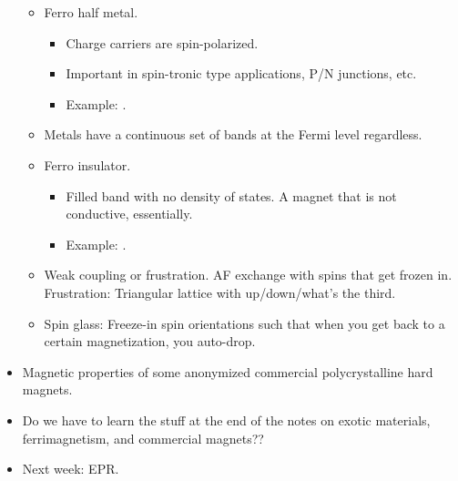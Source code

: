 \documentclass[../notes.tex]{subfiles}
\begin{document}
\begin{itemize}
\begin{itemize}
        \item Ferro half metal.
        \begin{itemize}
            \item Charge carriers are spin-polarized.
            \item Important in spin-tronic type applications, P/N junctions, etc.
            \item Example: .
        \end{itemize}
        \item Metals have a continuous set of bands at the Fermi level regardless.
        \item Ferro insulator.
        \begin{itemize}
            \item Filled band with no density of states. A magnet that is not conductive, essentially.
            \item Example: .
        \end{itemize}
        \item Weak coupling or frustration. AF exchange with spins that get frozen in. Frustration: Triangular lattice with up/down/what's the third.
        \item Spin glass: Freeze-in spin orientations such that when you get back to a certain magnetization, you auto-drop.
    \end{itemize}
    \item Magnetic properties of some anonymized commercial polycrystalline hard magnets.
    \item Do we have to learn the stuff at the end of the notes on exotic materials, ferrimagnetism, and commercial magnets??
    \item Next week: EPR.
\end{itemize}
\end{document}
